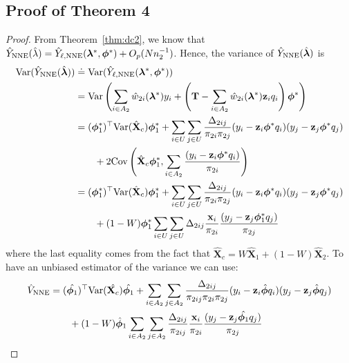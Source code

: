 \documentclass[12pt]{article}
\newcommand{\Cov}{{\text{Cov}}}
\newcommand{\Var}{{\text{Var}}}
\renewcommand{\bf}[1]{\mathbf{#1}}
\begin{document}
\subsection{Proof of Theorem 4}

\begin{proof}
  From Theorem~\ref{thm:dc2}, we know that $\hat Y_{\rm NNE}(\hat \lambda) = 
  \hat Y_{\ell, \rm NNE}(\bm \lambda^*, \bm \phi^*) + O_p(Nn_2^{-1})$. Hence, the
  variance of $\hat Y_{\rm NNE}(\hat{\bm \lambda})$ is 
  \begin{align*}
    \Var(\hat Y_{\rm NNE}(\hat{\bm \lambda})) 
    &\doteq \Var(\hat Y_{\ell, \rm NNE}(\bm \lambda^*, \bm \phi^*)) \\ 
    &= \Var\left(\sum_{i \in A_2} \hat w_{2i}(\bm \lambda^*) y_i + 
      \left(\bf T - \sum_{i \in A_2} \hat w_{2i}(\bm \lambda^*) \bf z_i
    q_i\right)\bm \phi^*\right)\\
    &= (\bm \phi_1^*)^\top \Var(\hat{\bf X}_c) \bm \phi_1^* + 
    \sum_{i \in U} \sum_{j \in U} \frac{\Delta_{2ij}}{\pi_{2i}\pi_{2j}} 
    (y_i - \bf z_i \bm \phi^* q_i)(y_j - \bf z_j \bm \phi^* q_j)\\
    &\qquad+ 2 \Cov\left(\hat{\bf X}_c \bm \phi_1^*, \sum_{i \in A_2} 
      \frac{(y_i - \bf z_i \bm \phi^* q_i)}{\pi_{2i}}\right) \\
    &= (\bm \phi_1^*)^\top \Var(\hat{\bf X}_c) \bm \phi_1^* + 
    \sum_{i \in U} \sum_{j \in U} \frac{\Delta_{2ij}}{\pi_{2i}\pi_{2j}} 
    (y_i - \bf z_i \bm \phi^* q_i)(y_j - \bf z_j \bm \phi^* q_j)\\
    &\qquad + (1 - W)\bm \phi_1^* \sum_{i \in U} \sum_{j \in U} \Delta_{2ij} 
    \frac{\bf{x}_i}{\pi_{2i}} \frac{(y_j - \bf z_j \bm \phi^*_1 q_j)}{\pi_{2j}}\\
  \end{align*}
where the last equality comes from the fact that $\hat{\bf X}_c = W\hat{\bf
X}_1 + (1 - W) \hat{\bf X}_2$. To have an unbiased estimator of the variance
  we can use:
  \begin{align*}
    \hat V_{\rm NNE} 
    &= (\hat{\bm \phi_1})^\top \Var(\hat{\bf X_c}) \hat{\bm \phi_1} + 
    \sum_{i \in A_2} \sum_{j \in A_2} \frac{\Delta_{2ij}}{\pi_{2ij}\pi_{2i}\pi_{2j}} 
    (y_i - \bf z_i \hat{\bm \phi} q_i)(y_j - \bf z_j \hat{\bm \phi} q_j) \\
    &\qquad + (1 - W)\hat{\bm \phi}_1 \sum_{i \in A_2} \sum_{j \in A_2} 
    \frac{\Delta_{2ij}}{\pi_{2ij}} \frac{\bf{x}_i}{\pi_{2i}} 
    \frac{(y_j - \bf z_j \hat{\bm \phi_1} q_j)}{\pi_{2j}}
  \end{align*}

\end{proof}
\end{document}
